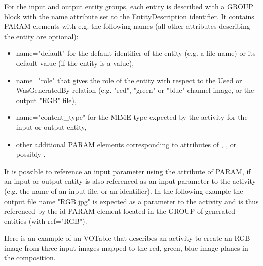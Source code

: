 For the input and output entity groups, each entity is described with a GROUP block with the name attribute set to the EntityDescription identifier. It contains PARAM elements with e.g. the following names (all other attributes describing the entity are optional):
\begin{itemize}
 \item name="default" for the default identifier of the entity (e.g. a file name) or its default value (if the entity is a value),
 \item name="role" that gives the role of the entity with respect to the Used or WasGeneratedBy relation (e.g. "red", "green" or "blue" channel image, or the output "RGB" file),
 \item name="content\_type" for the MIME type expected by the activity for the input or output entity,
 \item other additional PARAM elements corresponding to attributes of , ,  or possibly .
 \end{itemize} 
It is possible to reference an input parameter using the  attribute of PARAM, if an input or output entity is also referenced as an input parameter to the activity (e.g. the name of an input file, or an identifier). In the following example the output file name "RGB.jpg" is expected as a parameter to the activity and is thus referenced by the id PARAM element located in the GROUP of generated entities (with ref="RGB").

Here is an example of an  VOTable that describes an activity to create an RGB image from three input images mapped to the red, green, blue image planes in the composition. 

